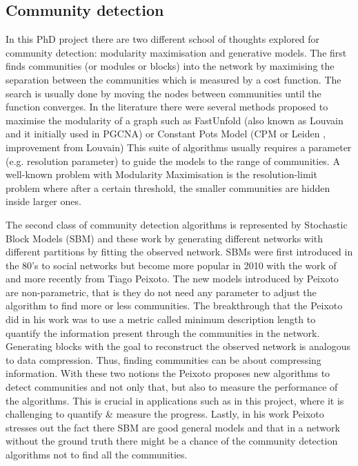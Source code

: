 \subsection{Community detection}

In this PhD project there are two different school of thoughts explored for community detection: modularity maximisation and generative models. The first finds communities (or modules or blocks) into the network by maximising the separation between the communities which is measured by a cost function. The search is usually done by moving the nodes between communities until the function converges. In the literature there were several methods proposed to maximise the modularity of a graph such as FastUnfold \citet{Blondel2008-ik} (also known as Louvain and it initially used in PGCNA) or Constant Pots Model (CPM or Leiden \citet{Traag2019-ne}, improvement from Louvain) This suite of algorithms usually requires a parameter (e.g. resolution parameter) to guide the models to the range of communities. A well-known problem with Modularity Maximisation is the resolution-limit problem where after a certain threshold, the smaller communities are hidden inside larger ones.

The second class of community detection algorithms is represented by Stochastic Block Models (SBM) and these work by generating different networks with different partitions by fitting the observed network. SBMs were first introduced in the 80's to social networks \citet{Holland1983-eu} but become more popular in 2010 with the work of \citet{Karrer2011-si} and more recently from Tiago Peixoto. The new models introduced by Peixoto are non-parametric, that is they do not need any parameter to adjust the algorithm to find more or less communities. The breakthrough that the Peixoto did in his work was to use a metric called minimum description length to quantify the information present through the communities in the network. Generating blocks with the goal to reconstruct the observed network is analogous to data compression. Thus, finding communities can be about compressing information. With these two notions the Peixoto proposes new algorithms to detect communities and not only that, but also to measure the performance of the algorithms. This is crucial in applications such as in this project, where it is challenging to quantify \& measure the progress. Lastly, in his work Peixoto stresses out the fact there SBM are good general models and that in a network without the ground truth there might be a chance of the community detection algorithms not to find all the communities.

